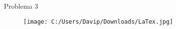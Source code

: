 \documentclass[
12pt, %
a4paper, %
brazil, %
oneside, %
]{abntex2}
\begin{document}
\vspace{0,5cm}

\newpage

\centering Problema 3

\begin{figure}[htb]
\begin{center}
\texttt{[image: C:/Users/Davip/Downloads/LaTex.jpg]}
\end{center}
\end{figure}
\end{document}
